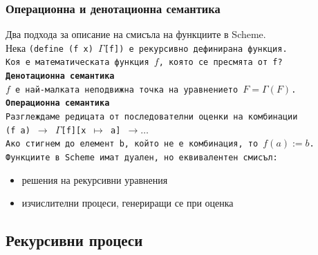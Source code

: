 \documentclass[alsotrans]{beamerswitch}
\begin{document}
\begin{frame}
  \frametitle{Операционна и денотационна семантика}

  Два подхода за описание на смисъла на функциите в Scheme.\\
  \pause
  Нека \tt{(define (f x) $\Gamma$[f])} е рекурсивно дефинирана функция.\\
  \pause
  \alert{Коя е математическата функция $f$, която се пресмята от \tt f?}\\[1em]
  \pause
  \textbf{Денотационна семантика}\\
  $f$ е най-малката неподвижна точка на уравнението $F = \Gamma(F)$.\\[1em]
  \pause
  \textbf{Операционна семантика}\\
  Разглеждаме редицата от последователни оценки на комбинации\\
  \tt{(f a)} $\rightarrow$ \tt{$\Gamma$[f][x $\mapsto$ a]} $\rightarrow\ldots$\\
  Ако стигнем до елемент \tt b, който не е комбинация, то $f(a) := b$.\\[1em]
  \pause
  \alert{Функциите в Scheme имат дуален, но еквивалентен смисъл:}
  \begin{itemize}
  \item решения на рекурсивни уравнения
  \item изчислителни процеси, генериращи се при оценка
  \end{itemize}
\end{frame}

\subsection{Рекурсивни процеси}
\end{document}
